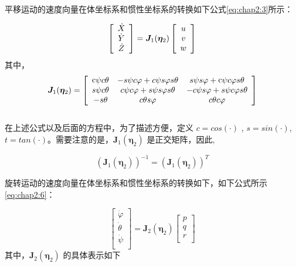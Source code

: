 平移运动的速度向量在体坐标系和惯性坐标系的转换如下公式\ref{eq:chap2:3}所示：

\begin{equation}
\centering
\label{eq:chap2:3}
\left[ {\begin{array}{*{20}{c}}
   {\dot X}  \\
   {\dot Y}  \\
   {\dot Z}  \\
\end{array}} \right] =
 {{\bm{J}}_{1}(\bm{\eta}_{2})}
\left[ {\begin{array}{*{20}{c}}
   u  \\
   v  \\
   w  \\
\end{array}} \right]
\end{equation}
其中，
\begin{equation*}
\centering
\label{eq:chap2:4}
{{\bm{J}}_{1}(\bm{\eta} _{2})} =
\left[
{\begin{array}{*{20}{c}}
   {{\mathop{\rm c}\nolimits}  \psi  c \theta  } & { - s \psi  c \varphi   + c \psi  s \varphi  s \theta  } & {s \psi  s \varphi   + {\mathop{\rm c}\nolimits}  \psi  c \varphi  s \theta  }  \\
   {s \psi  c \theta  } & {c \psi  c \varphi   + s \psi  s \varphi  s \theta  } & { - c \psi  s \varphi   + s \psi  c \varphi  s \theta  }  \\
   { - s \theta  } & {c \theta  s \varphi  } & {c \theta  c \varphi  }  \\
\end{array}}
\right]
\end{equation*}
\\
在上述公式以及后面的方程中，为了描述方便，定义 $ c= cos(·)$ ,  $s = sin(·)$, $t = tan(·)$。需要注意的是，${{\bm{J}}_{1}(\bm{\eta} _{2})}$ 是正交矩阵，因此,

\begin{equation}
\label{eq:chap2:5}
({{\bm{J}}_{1}(\bm{\eta} _{2})})^{-1} = ({{\bm{J}}_{1}(\bm{\eta} _{2})})^T
\end{equation}

旋转运动的速度向量在体坐标系和惯性坐标系的转换如下，如下公式所示\ref{eq:chap2:6}：

\begin{equation}
\label{eq:chap2:6}
\left[ {\begin{array}{*{20}{c}}
   \dot \varphi   \\
   \dot \theta   \\
   \dot \psi   \\
\end{array}} \right] = {\bm{J}_2(\bm{\eta}_2)}
\left[ {\begin{array}{*{20}{c}}
   p  \\
   q  \\
   r  \\
\end{array}} \right]
\end{equation}
其中，${\bm{J}_2(\bm{\eta}_2)}$ 的具体表示如下

